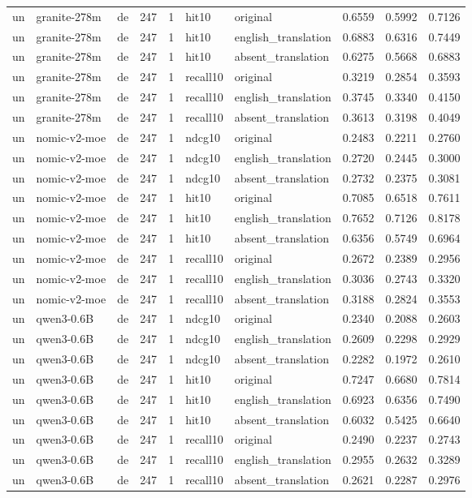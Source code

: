 \begin{tabular}{lllrrllrrr}
un & granite-278m & de & 247 & 1 & hit10 & original & 0.6559 & 0.5992 & 0.7126 \\
un & granite-278m & de & 247 & 1 & hit10 & english\_translation & 0.6883 & 0.6316 & 0.7449 \\
un & granite-278m & de & 247 & 1 & hit10 & absent\_translation & 0.6275 & 0.5668 & 0.6883 \\
un & granite-278m & de & 247 & 1 & recall10 & original & 0.3219 & 0.2854 & 0.3593 \\
un & granite-278m & de & 247 & 1 & recall10 & english\_translation & 0.3745 & 0.3340 & 0.4150 \\
un & granite-278m & de & 247 & 1 & recall10 & absent\_translation & 0.3613 & 0.3198 & 0.4049 \\
un & nomic-v2-moe & de & 247 & 1 & ndcg10 & original & 0.2483 & 0.2211 & 0.2760 \\
un & nomic-v2-moe & de & 247 & 1 & ndcg10 & english\_translation & 0.2720 & 0.2445 & 0.3000 \\
un & nomic-v2-moe & de & 247 & 1 & ndcg10 & absent\_translation & 0.2732 & 0.2375 & 0.3081 \\
un & nomic-v2-moe & de & 247 & 1 & hit10 & original & 0.7085 & 0.6518 & 0.7611 \\
un & nomic-v2-moe & de & 247 & 1 & hit10 & english\_translation & 0.7652 & 0.7126 & 0.8178 \\
un & nomic-v2-moe & de & 247 & 1 & hit10 & absent\_translation & 0.6356 & 0.5749 & 0.6964 \\
un & nomic-v2-moe & de & 247 & 1 & recall10 & original & 0.2672 & 0.2389 & 0.2956 \\
un & nomic-v2-moe & de & 247 & 1 & recall10 & english\_translation & 0.3036 & 0.2743 & 0.3320 \\
un & nomic-v2-moe & de & 247 & 1 & recall10 & absent\_translation & 0.3188 & 0.2824 & 0.3553 \\
un & qwen3-0.6B & de & 247 & 1 & ndcg10 & original & 0.2340 & 0.2088 & 0.2603 \\
un & qwen3-0.6B & de & 247 & 1 & ndcg10 & english\_translation & 0.2609 & 0.2298 & 0.2929 \\
un & qwen3-0.6B & de & 247 & 1 & ndcg10 & absent\_translation & 0.2282 & 0.1972 & 0.2610 \\
un & qwen3-0.6B & de & 247 & 1 & hit10 & original & 0.7247 & 0.6680 & 0.7814 \\
un & qwen3-0.6B & de & 247 & 1 & hit10 & english\_translation & 0.6923 & 0.6356 & 0.7490 \\
un & qwen3-0.6B & de & 247 & 1 & hit10 & absent\_translation & 0.6032 & 0.5425 & 0.6640 \\
un & qwen3-0.6B & de & 247 & 1 & recall10 & original & 0.2490 & 0.2237 & 0.2743 \\
un & qwen3-0.6B & de & 247 & 1 & recall10 & english\_translation & 0.2955 & 0.2632 & 0.3289 \\
un & qwen3-0.6B & de & 247 & 1 & recall10 & absent\_translation & 0.2621 & 0.2287 & 0.2976 \\
\bottomrule
\end{tabular}
